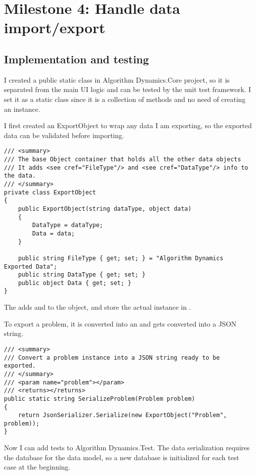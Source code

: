 \documentclass[report.tex]{subfiles}
\begin{document}
\section{Milestone 4: Handle data import/export}

\subsection{Implementation and testing}

I created a public static class in Algorithm Dynamics.Core project, so it is separated from the main UI logic and can be tested by the unit test framework. I set it as a static class since it is a collection of methods and no need of creating an instance.

I first created an ExportObject to wrap any data I am exporting, so the exported data can be validated before importing.

\begin{verbatim}
/// <summary>
/// The base Object container that holds all the other data objects
/// It adds <see cref="FileType"/> and <see cref="DataType"/> info to the data.
/// </summary>
private class ExportObject
{
    public ExportObject(string dataType, object data)
    {
        DataType = dataType;
        Data = data;
    }

    public string FileType { get; set; } = "Algorithm Dynamics Exported Data";
    public string DataType { get; set; }
    public object Data { get; set; }
}
\end{verbatim}

The  adds  and  to the object, and store the actual instance in .

To export a problem, it is converted into an  and gets converted into a JSON string.

\begin{verbatim}
/// <summary>
/// Convert a problem instance into a JSON string ready to be exported.
/// </summary>
/// <param name="problem"></param>
/// <returns></returns>
public static string SerializeProblem(Problem problem)
{
    return JsonSerializer.Serialize(new ExportObject("Problem", problem));
}
\end{verbatim}

Now I can add tests to Algorithm Dynamics.Test. The data serialization requires the database for the data model, so a new database is initialized for each test case at the beginning.
\end{document}
